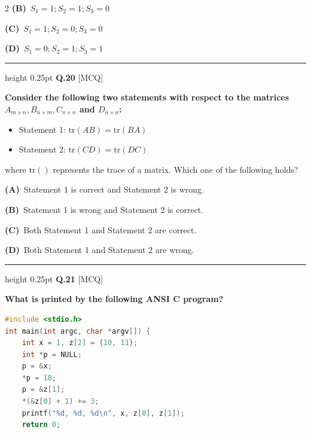 \documentclass[a4paper,10pt,twoside]{article}
\begin{document}
\begin{multicols}{2}
\textbf{(B)}~$S_1 = 1; S_2 = 1; S_3 = 0$\par\vspace{2pt}\noindent
\textbf{(C)}~$S_1 = 1; S_2 = 0; S_3 = 0$\par\vspace{2pt}\noindent
\textbf{(D)}~$S_1 = 0; S_2 = 1; S_3 = 1$
\par\vspace{6pt}\hrule height 0.25pt\vspace{6pt}
\noindent\textbf{Q.20} \hfill {\footnotesize\textsf{[MCQ]}}
\par\vspace{2pt}
{\bfseries Consider the following two statements with respect to the matrices $A_{m \times n}, B_{n \times m}, C_{n \times n}$ and $D_{n \times n}$:
\begin{itemize}[itemsep=0pt,topsep=2pt]
\item Statement 1: $\text{tr}(AB) = \text{tr}(BA)$
\item Statement 2: $\text{tr}(CD) = \text{tr}(DC)$
\end{itemize}
where $\text{tr}()$ represents the trace of a matrix. Which one of the following holds? \par}
\par\vspace{2pt}\noindent
\textbf{(A)}~Statement 1 is correct and Statement 2 is wrong.\par\vspace{2pt}\noindent
\textbf{(B)}~Statement 1 is wrong and Statement 2 is correct.\par\vspace{2pt}\noindent
\textbf{(C)}~Both Statement 1 and Statement 2 are correct.\par\vspace{2pt}\noindent
\textbf{(D)}~Both Statement 1 and Statement 2 are wrong.
\par\vspace{6pt}\hrule height 0.25pt\vspace{6pt}
\noindent\textbf{Q.21} \hfill {\footnotesize\textsf{[MCQ]}}
\par\vspace{2pt}
{\bfseries What is printed by the following ANSI C program?
\begin{lstlisting}[language=C]
#include <stdio.h>
int main(int argc, char *argv[]) {
    int x = 1, z[2] = {10, 11};
    int *p = NULL;
    p = &x;
    *p = 10;
    p = &z[1];
    *(&z[0] + 1) += 3;
    printf("%d, %d, %d\n", x, z[0], z[1]);
    return 0;

\end{lstlisting}}
\end{multicols}
\end{document}
